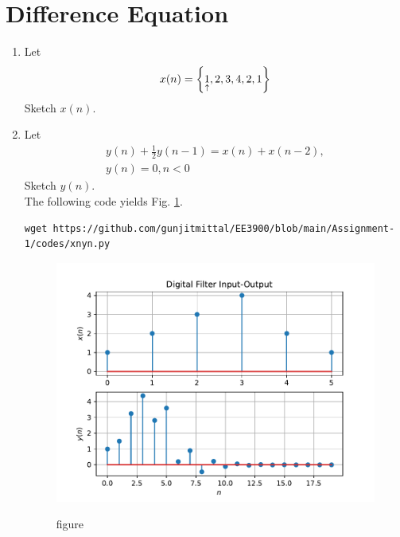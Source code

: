 \documentclass[journal,12pt,twocolumn]{IEEEtran}
\renewcommand\thesection{\arabic{section}}
\begin{document}
\section{Difference Equation}
\begin{enumerate}[label=\thesection.\arabic*,ref=\thesection.\theenumi]
\item Let
\begin{equation}
x(n) = \left\{\underset{\uparrow}{1},2,3,4,2,1\right\}
\end{equation}
Sketch $x(n)$.
\item Let
\begin{multline}
\label{eq:iir_filter}
y(n) + \frac{1}{2}y(n-1) = x(n) + x(n-2), 
\\
 y(n) = 0, n < 0
\end{multline}
Sketch $y(n)$.
\\
\solution The following code yields Fig. \ref{fig:xnyn}.
\begin{lstlisting}
wget https://github.com/gunjitmittal/EE3900/blob/main/Assignment-1/codes/xnyn.py
\end{lstlisting}
\begin{figure}[!ht]
\begin{center}
\includegraphics[width=\columnwidth]{./figs/xnyn}
\end{center}
\caption{figure}{}
\label{fig:xnyn}	
\end{figure}
\end{enumerate}
\end{document}
